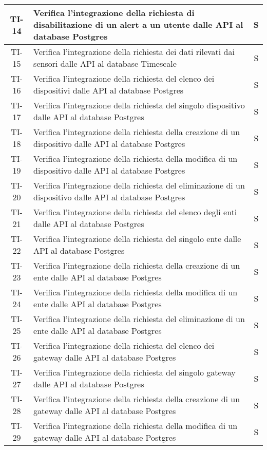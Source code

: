 \begin{center}
\begin{longtable}{|c|p{12cm}|c|}
			\hline
			TI-14 & Verifica l'integrazione della richiesta di disabilitazione di un alert a un utente dalle API al database Postgres & S \\
			\hline
			TI-15 & Verifica l'integrazione della richiesta dei dati rilevati dai sensori dalle API al database Timescale & S \\
			\hline
			TI-16 & Verifica l'integrazione della richiesta del elenco dei dispositivi dalle API al database Postgres & S \\
			\hline
			TI-17 & Verifica l'integrazione della richiesta del singolo dispositivo dalle API al database Postgres & S \\
			\hline
			TI-18 & Verifica l'integrazione della richiesta della creazione di un dispositivo dalle API al database Postgres & S \\
			\hline
			TI-19 & Verifica l'integrazione della richiesta della modifica di un dispositivo dalle API al database Postgres & S \\
			\hline
			TI-20 & Verifica l'integrazione della richiesta del eliminazione di un dispositivo dalle API al database Postgres & S \\
			\hline
			TI-21 & Verifica l'integrazione della richiesta del elenco degli enti dalle API al database Postgres & S \\
			\hline
			TI-22 & Verifica l'integrazione della richiesta del singolo ente dalle API al database Postgres & S \\
			\hline
			TI-23 & Verifica l'integrazione della richiesta della creazione di un ente dalle API al database Postgres & S \\
			\hline
			TI-24 & Verifica l'integrazione della richiesta della modifica di un ente dalle API al database Postgres & S \\
			\hline
			TI-25 & Verifica l'integrazione della richiesta del eliminazione di un ente dalle API al database Postgres & S \\
			\hline
			TI-26 & Verifica l'integrazione della richiesta del elenco dei gateway dalle API al database Postgres & S \\
			\hline
			TI-27 & Verifica l'integrazione della richiesta del singolo gateway dalle API al database Postgres & S \\
			\hline
			TI-28 & Verifica l'integrazione della richiesta della creazione di un gateway dalle API al database Postgres & S \\
			\hline
			TI-29 & Verifica l'integrazione della richiesta della modifica di un gateway dalle API al database Postgres & S \\

\end{longtable}
\end{center}
